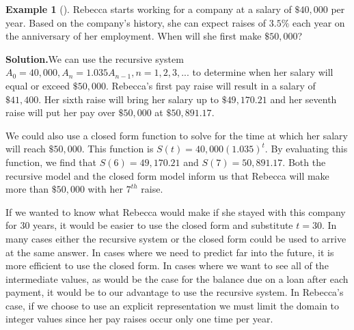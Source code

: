 \documentclass[10pt,]{book}
\theoremstyle{plain}
\theoremstyle{definition}
\theoremstyle{definition}
\newtheorem{example}[theorem]{Example}
\theoremstyle{definition}
\numberwithin{equation}{section}
\begin{document}
\begin{example}[]\label{example-recursive-salary}
Rebecca starts working for a company at a salary of \(\$40,000\) per year. Based on the company's history, she can expect raises of \(3.5\%\) each year on the anniversary of her employment. When will she first make \(\$50,000\)?%
\par\medskip\noindent%
\textbf{Solution.}\quad We can use the recursive system \(A_0=40,000, A_n=1.035A_{n-1}, n=1,2,3,...\) to determine when her salary will equal or exceed \(\$50,000\).  Rebecca’s first pay raise will result in a salary of \(\$41,400\).  Her sixth raise will bring her salary up to \(\$49,170.21\) and her seventh raise will put her pay over \(\$50,000\) at \(\$50,891.17\).%
\par
We could also use a closed form function to solve for the time at which her salary will reach \(\$50,000\).  This function is \(S(t)=40,000(1.035)^t\). By evaluating this function, we find that \(S(6)=49,170.21\) and \(S(7)=50,891.17\). Both the recursive model and the closed form model inform us that Rebecca will make more than \(\$50,000\) with her \(7^{th}\) raise.%
\par
If we wanted to know what Rebecca would make if she stayed with this company for \(30\) years, it would be easier to use the closed form and substitute \(t=30\).  In many cases either the recursive system or the closed form could be used to arrive at the same answer. In cases where we need to predict far into the future, it is more efficient to use the closed form. In cases where we want to see all of the intermediate values, as would be the case for the balance due on a loan after each payment, it would be to our advantage to use the recursive system. In Rebecca's case, if we choose to use an explicit representation we must limit the domain to integer values since her pay raises occur only one time per year.%
\end{example}
\end{document}
